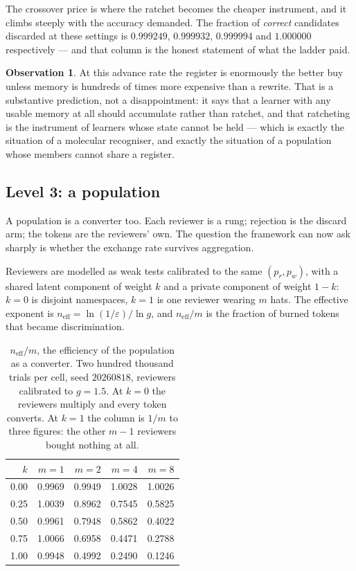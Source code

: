 \documentclass[11pt]{article}
\theoremstyle{plain}
\theoremstyle{definition}
\newtheorem{observation}[theorem]{Observation}
\theoremstyle{remark}
\begin{document}
The crossover price is where the ratchet becomes the cheaper instrument, and
it climbs steeply with the accuracy demanded. The fraction of \emph{correct}
candidates discarded at these settings is $0.999249$, $0.999932$, $0.999994$
and $1.000000$ respectively --- and that column is the honest statement of
what the ladder paid.

\begin{observation}
At this advance rate the register is enormously the better buy unless memory
is hundreds of times more expensive than a rewrite. That is a substantive
prediction, not a disappointment: it says that a learner with any usable
memory at all should accumulate rather than ratchet, and that ratcheting is
the instrument of learners whose state cannot be held --- which is exactly the
situation of a molecular recogniser, and exactly the situation of a
population whose members cannot share a register.
\end{observation}

\subsection{Level 3: a population}
\label{sec:l3}

A population is a converter too. Each reviewer is a rung; rejection is the
discard arm; the tokens are the reviewers' own. The question the framework can
now ask sharply is whether the exchange rate survives aggregation.

Reviewers are modelled as weak tests calibrated to the same $(p_r, p_w)$, with
a shared latent component of weight $k$ and a private component of weight
$1-k$: $k = 0$ is disjoint namespaces, $k = 1$ is one reviewer wearing $m$
hats. The effective exponent is $n_{\mathrm{eff}} = \ln(1/\varepsilon)/\ln g$,
and $n_{\mathrm{eff}}/m$ is the fraction of burned tokens that became
discrimination.

\begin{table}[h]
\centering
\begin{tabular}{@{}rrrrr@{}}
\toprule
$k$ & $m=1$ & $m=2$ & $m=4$ & $m=8$ \\
\midrule
0.00 & 0.9969 & 0.9949 & 1.0028 & 1.0026 \\
0.25 & 1.0039 & 0.8962 & 0.7545 & 0.5825 \\
0.50 & 0.9961 & 0.7948 & 0.5862 & 0.4022 \\
0.75 & 1.0066 & 0.6958 & 0.4471 & 0.2788 \\
1.00 & 0.9948 & 0.4992 & 0.2490 & 0.1246 \\
\bottomrule
\end{tabular}
\caption{$n_{\mathrm{eff}}/m$, the efficiency of the population as a converter.
Two hundred thousand trials per cell, seed $20260818$, reviewers calibrated to
$g = 1.5$. At $k = 0$ the reviewers multiply and every token converts. At
$k = 1$ the column is $1/m$ to three figures: the other $m-1$ reviewers bought
nothing at all.}
\label{tab:e6}
\end{table}
\end{document}
